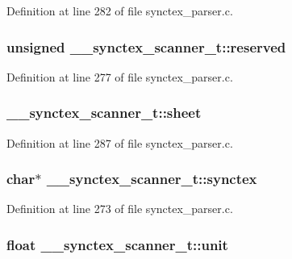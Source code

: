 Definition at line 282 of file synctex\+\_\+parser.\+c.

\hypertarget{struct____synctex__scanner__t_ab769f28f38ed13f3b67bdeef142c8072}{
\subsubsection[{reserved}]{\setlength{\rightskip}{0pt plus 5cm}unsigned \+\_\+\+\_\+synctex\+\_\+scanner\+\_\+t\+::reserved}}\label{struct____synctex__scanner__t_ab769f28f38ed13f3b67bdeef142c8072}


Definition at line 277 of file synctex\+\_\+parser.\+c.

\hypertarget{struct____synctex__scanner__t_a8438cc8e64fd36c7dcb54b6f3c1450dd}{
\subsubsection[{sheet}]{ \+\_\+\+\_\+synctex\+\_\+scanner\+\_\+t\+::sheet}}\label{struct____synctex__scanner__t_a8438cc8e64fd36c7dcb54b6f3c1450dd}


Definition at line 287 of file synctex\+\_\+parser.\+c.

\hypertarget{struct____synctex__scanner__t_a7bdf8f488a5bb7ed9a21b4ded5db693f}{
\subsubsection[{synctex}]{\setlength{\rightskip}{0pt plus 5cm}char$\ast$ \+\_\+\+\_\+synctex\+\_\+scanner\+\_\+t\+::synctex}}\label{struct____synctex__scanner__t_a7bdf8f488a5bb7ed9a21b4ded5db693f}


Definition at line 273 of file synctex\+\_\+parser.\+c.

\hypertarget{struct____synctex__scanner__t_a2172ebc84061c83e8e9c9d2039dfb3cb}{
\subsubsection[{unit}]{\setlength{\rightskip}{0pt plus 5cm}float \+\_\+\+\_\+synctex\+\_\+scanner\+\_\+t\+::unit}}\label{struct____synctex__scanner__t_a2172ebc84061c83e8e9c9d2039dfb3cb}


